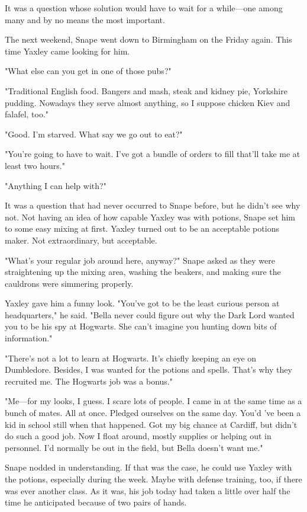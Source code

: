 It was a question whose solution would have to wait for a while—one among many and by no means the most important.

The next weekend, Snape went down to Birmingham on the Friday again. This time Yaxley came looking for him.

"What else can you get in one of those pubs?"

"Traditional English food. Bangers and mash, steak and kidney pie, Yorkshire pudding. Nowadays they serve almost anything, so I suppose chicken Kiev and falafel, too."

"Good. I'm starved. What say we go out to eat?"

"You're going to have to wait. I've got a bundle of orders to fill that'll take me at least two hours."

"Anything I can help with?"

It was a question that had never occurred to Snape before, but he didn't see why not. Not having an idea of how capable Yaxley was with potions, Snape set him to some easy mixing at first. Yaxley turned out to be an acceptable potions maker. Not extraordinary, but acceptable.

"What's your regular job around here, anyway?" Snape asked as they were straightening up the mixing area, washing the beakers, and making sure the cauldrons were simmering properly.

Yaxley gave him a funny look. "You've got to be the least curious person at headquarters," he said. "Bella never could figure out why the Dark Lord wanted you to be his spy at Hogwarts. She can't imagine you hunting down bits of information."

"There's not a lot to learn at Hogwarts. It's chiefly keeping an eye on Dumbledore. Besides, I was wanted for the potions and spells. That's why they recruited me. The Hogwarts job was a bonus."

"Me—for my looks, I guess. I scare lots of people. I came in at the same time as a bunch of mates. All at once. Pledged ourselves on the same day. You'd 've been a kid in school still when that happened. Got my big chance at Cardiff, but didn't do such a good job. Now I float around, mostly supplies or helping out in personnel. I'd normally be out in the field, but Bella doesn't want me."

Snape nodded in understanding. If that was the case, he could use Yaxley with the potions, especially during the week. Maybe with defense training, too, if there was ever another class. As it was, his job today had taken a little over half the time he anticipated because of two pairs of hands.

